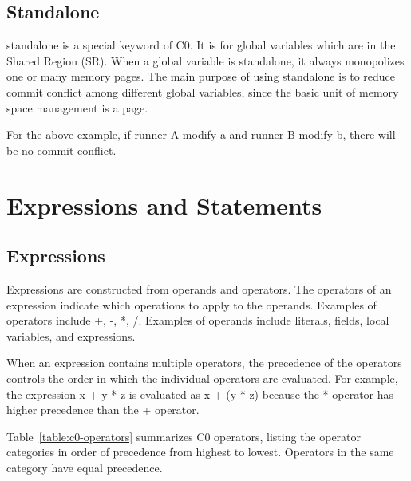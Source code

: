\documentclass[a4paper]{article}
\DeclareRobustCommand{\mybox}[2][gray!20]{%
\begin{tcolorbox}[   %
        breakable,
        left=0pt,
        right=0pt,
        top=0pt,
        bottom=0pt,
        colback=#1,
        colframe=#1,
        width=\dimexpr\textwidth\relax, 
        enlarge left by=0mm,
        boxsep=5pt,
        arc=0pt,outer arc=0pt,
        ]
        #2
\end{tcolorbox}
}
\begin{document}
{\color{lightblue}\subsection{Standalone}}
standalone is a special keyword of C0. It is for global variables which are in the Shared Region (SR). When a global variable is standalone, it always monopolizes one or many memory pages. The main purpose of using standalone is to reduce commit conflict among different global variables, since the basic unit of memory space management is a page.

\mybox[gray!20]
{\color{blue}{}}

For the above example, if runner A modify a and runner B modify b, there will be no commit conflict.

{\color{darkblue}\section{Expressions and Statements}}

{\color{lightblue}\subsection{Expressions}}

Expressions are constructed from operands and operators. The operators of an expression indicate which operations to apply to the operands. Examples of operators include +, -, *, /. Examples of operands include literals, fields, local variables, and expressions.

When an expression contains multiple operators, the precedence of the operators controls the order in which the individual operators are evaluated. For example, the expression x + y * z is evaluated as x + (y * z) because the * operator has higher precedence than the + operator.

Table~\ref{table:c0-operators} summarizes C0 operators, listing the operator categories in order of precedence from highest to lowest. Operators in the same category have equal precedence.
\end{document}
